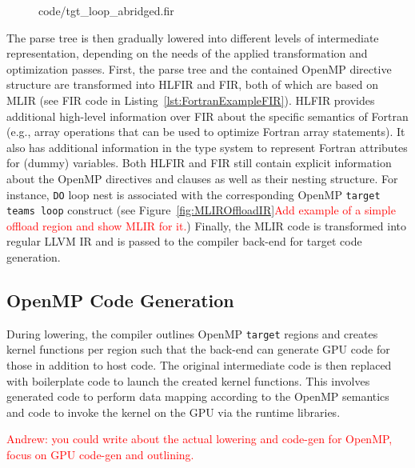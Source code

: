 \documentclass[acmtog,natbib=false]{acmart}
\newcommand{\todo}[1]{\textcolor{red}{#1}}
\newcommand{\code}[1]{\texttt{#1}\xspace}
\begin{document}
\begin{figure}[t]

                {code/tgt_loop_abridged.fir}
\end{figure}

The parse tree is then gradually lowered into different levels of intermediate representation, depending on the needs of the applied transformation and optimization passes.
First, the parse tree and the contained OpenMP directive structure are transformed into \ac{HLFIR} and \ac{FIR}, both of which are based on \ac{MLIR} (see \ac{FIR} code in Listing~\ref{lst:FortranExampleFIR}).
\Ac{HLFIR} provides additional high-level information over \ac{FIR} about the specific semantics of Fortran (e.g., array operations that can be used to optimize Fortran array statements).
It also has additional information in the type system to represent Fortran attributes for (dummy) variables.
Both \ac{HLFIR} and \ac{FIR} still contain explicit information about the OpenMP directives and clauses as well as their nesting structure.
For instance, \code{DO} loop nest is associated with the corresponding OpenMP \code{target teams loop} construct (see Figure~\ref{fig:MLIROffloadIR}\todo{Add example of a simple offload region and show MLIR for it.})
Finally, the \ac{MLIR} code is transformed into regular LLVM \ac{IR} and is passed to the compiler back-end for target code generation.


\subsection{OpenMP Code Generation}
\label{sec:OpenMPCodeGen}

During lowering, the compiler outlines OpenMP \code{target} regions and creates kernel functions per region such that the back-end can generate \ac{GPU} code for those in addition to host code.
The original intermediate code is then replaced with boilerplate code to launch the created kernel functions.
This involves generated code to perform data mapping according to the OpenMP semantics and code to invoke the kernel on the GPU via the runtime libraries.

\todo{Andrew: you could write about the actual lowering and code-gen for OpenMP, focus on GPU code-gen and outlining.}

\end{document}
